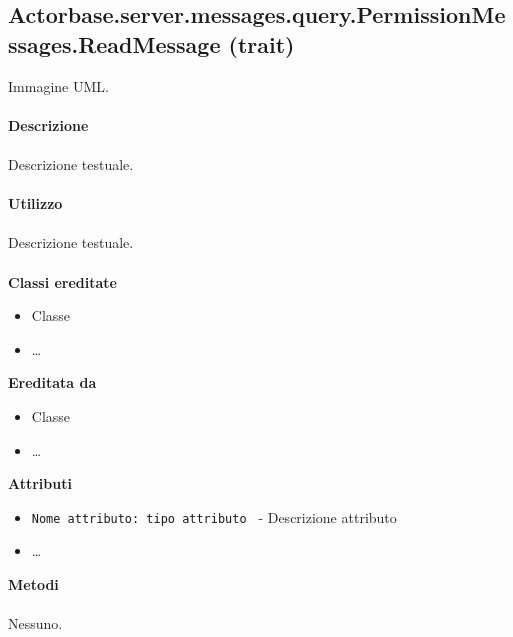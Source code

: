 \documentclass[a4paper]{article}
\begin{document}
\subsection{Actorbase.server.messages.query.PermissionMessages.ReadMessage (trait)}
		Immagine UML.
		\\ \\
		\textbf{Descrizione}
			\\ \\
			Descrizione testuale.
			\\ \\
		\textbf{Utilizzo}
			\\ \\
			Descrizione testuale.
			\\ \\
		\textbf{Classi ereditate}
			\begin{itemize}
				\item Classe
				\item \dots
			\end{itemize}
		\textbf{Ereditata da}
			\begin{itemize}
				\item Classe
				\item \dots
			\end{itemize}
		\textbf{Attributi}
			\begin{itemize}
				\item \texttt{Nome attributo: tipo attributo } - Descrizione attributo
				\item \dots
			\end{itemize}
		\textbf{Metodi}
			\\ \\
			Nessuno.
			
\end{document}
